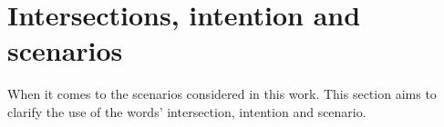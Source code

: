 
\section{Intersections, intention and scenarios}
\label{sec:intro_intersections}
When it comes to the scenarios considered in this work. This section aims to clarify the use of the words' intersection, intention and scenario.


